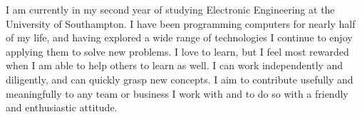 
I am currently in my second year of studying Electronic Engineering at the University of Southampton. I have been programming computers for nearly half of my life, and having explored a wide range of technologies I continue to enjoy applying them to solve new problems. I love to learn, but I feel most rewarded when I am able to help others to learn as well. I can work independently and diligently, and can quickly grasp new concepts. I aim to contribute usefully and meaningfully to any team or business I work with and to do so with a friendly and enthusiastic attitude.
